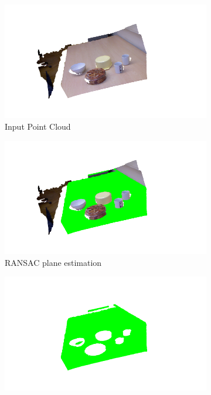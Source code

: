 \begin{figure}[tb]
\centering
\begin{subfigure}[t]{0.32\textwidth}
\includegraphics[width = 1.1\textwidth]{Img/ObjectSegmentation/pcl.png}
\caption{Input Point Cloud}\label{img:obj_pointcloud}
\end{subfigure}
\begin{subfigure}[t]{0.32\textwidth}
\includegraphics[width = 1.1\textwidth]{Img/ObjectSegmentation/ransac.png}
\caption{RANSAC plane estimation}\label{img:obj_ransac}
\end{subfigure}
\begin{subfigure}[t]{0.32\textwidth}
\includegraphics[width = 1.1\textwidth]{Img/ObjectSegmentation/plane.png}

\end{subfigure}
\end{figure}
